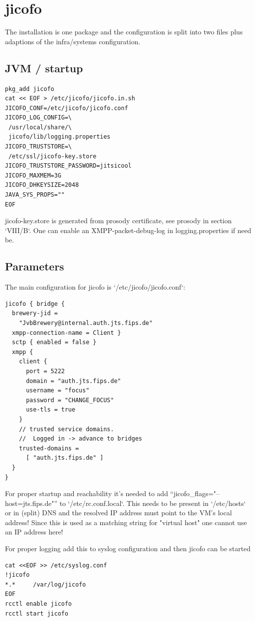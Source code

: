 \documentclass[10pt,conference]{IEEEtran}
\begin{document}
\section{jicofo}
The installation is one package and the configuration is split into two files plus
adaptions of the infra/systems configuration.

\subsection{JVM / startup}

\begin{verbatim}
pkg_add jicofo
cat << EOF > /etc/jicofo/jicofo.in.sh
JICOFO_CONF=/etc/jicofo/jicofo.conf
JICOFO_LOG_CONFIG=\
 /usr/local/share/\
 jicofo/lib/logging.properties
JICOFO_TRUSTSTORE=\
 /etc/ssl/jicofo-key.store
JICOFO_TRUSTSTORE_PASSWORD=jitsicool
JICOFO_MAXMEM=3G
JICOFO_DHKEYSIZE=2048
JAVA_SYS_PROPS=""
EOF
\end{verbatim}

jicofo-key.store is generated from prosody certificate, see prosody in section `VIII/B`.
One can enable an XMPP-packet-debug-log in logging.properties if need be.

\subsection{Parameters}
The main configuration for jicofo is `/etc/jicofo/jicofo.conf`:

\begin{verbatim}
jicofo { bridge {
  brewery-jid =
    "JvbBrewery@internal.auth.jts.fips.de"
  xmpp-connection-name = Client }
  sctp { enabled = false }
  xmpp {
    client {
      port = 5222
      domain = "auth.jts.fips.de"
      username = "focus"
      password = "CHANGE_FOCUS"
      use-tls = true
    }
    // trusted service domains.
    //  Logged in -> advance to bridges
    trusted-domains =
      [ "auth.jts.fips.de" ]
  }
}
\end{verbatim}

For proper startup and reachability it's needed to add ``jicofo_flags="--host=jts.fips.de"''
to `/etc/rc.conf.local`. This needs to be present in `/etc/hosts` or in (split) DNS and the
resolved IP address must point to the VM's local address! Since this is used as a matching
string for "virtual host" one cannot use an IP address here!

For proper logging add this to syslog configuration and then jicofo can be started
\begin{verbatim}
cat <<EOF >> /etc/syslog.conf
!jicofo
*.*     /var/log/jicofo
EOF
rcctl enable jicofo
rcctl start jicofo
\end{verbatim}
\end{document}
